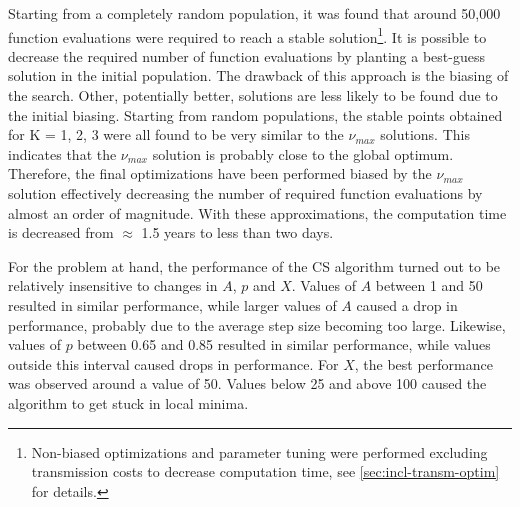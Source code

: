\documentclass[a4paper, 5p, sort&compress]{elsarticle}%
\begin{document}
Starting from a completely random population, it was found that around
50,000 function evaluations were required to reach a stable
solution\footnote{Non-biased optimizations and parameter tuning were
  performed excluding transmission costs to decrease computation time,
  see \cref{sec:incl-transm-optim} for details.}.
It is possible to decrease the required number of function evaluations
by planting a best-guess solution in the initial population. The
drawback of this approach is the biasing of the search. Other,
potentially better, solutions are less likely to be found due to the
initial biasing. Starting from random populations, the stable points
obtained for K = 1, 2, 3 were all found to be very similar to the
$\nu_{max}$ solutions. This indicates that the $\nu_{max}$ solution is
probably close to the global optimum. Therefore, the final
optimizations have been performed biased by the $\nu_{max}$ solution
effectively decreasing the number of required function evaluations by
almost an order of magnitude. With these approximations, the
computation time is decreased from $\approx$ 1.5 years to less than
two days.

For the problem at hand, the performance of the CS algorithm turned
out to be relatively insensitive to changes in $A$, $p$ and
$X$. Values of $A$ between 1 and 50 resulted in similar performance,
while larger values of $A$ caused a drop in performance, probably due
to the average step size becoming too large. Likewise, values of $p$
between 0.65 and 0.85 resulted in similar performance, while values
outside this interval caused drops in performance. For $X$, the best
performance was observed around a value of 50. Values below 25 and
above 100 caused the algorithm to get stuck in local minima.
\end{document}
